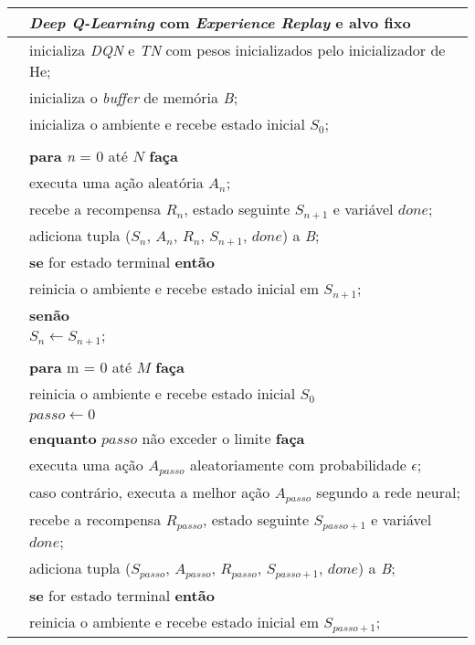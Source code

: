 \begin{tabular}{l l}

\hline
 & \textit{Deep Q-Learning} com \textit{Experience Replay} e alvo fixo\\
\hline

 & inicializa \textit{DQN} e \textit{TN} com pesos inicializados pelo inicializador de He;\\
 & inicializa o \textit{buffer} de memória \textit{B};\\
 & inicializa o ambiente e recebe estado inicial $S_{0}$;\\
\\
 & \textbf{para} \textit{n} = 0 até $N$ \textbf{faça}\\
 & \qquad executa uma ação aleatória $A_{n}$;\\
 & \qquad recebe a recompensa $R_{n}$, estado seguinte $S_{n+1}$ e variável $done$;\\
 & \qquad adiciona tupla ($S_{n}$, $A_{n}$, $R_{n}$, $S_{n+1}$, $done$) a \textit{B};\\
 & \qquad \textbf{se} for estado terminal \textbf{então}\\
 & \qquad \qquad reinicia o ambiente e recebe estado inicial em $S_{n+1}$;\\
 & \qquad \textbf{senão}\\
 & \qquad \qquad $S_{n} \leftarrow S_{n+1};$ \\
\\
 & \textbf{para} m = 0 até $M$ \textbf{faça}\\
 & \qquad reinicia o ambiente e recebe estado inicial $S_{0}$\\
 & \qquad $passo \leftarrow 0$\\
 & \qquad \textbf{enquanto} $passo$ não exceder o limite \textbf{faça}\\
 & \qquad \qquad executa uma ação $A_{passo}$ aleatoriamente com probabilidade $\epsilon$;\\
 & \qquad \qquad caso contrário, executa a melhor ação $A_{passo}$ segundo a rede neural;\\
 & \qquad \qquad recebe a recompensa $R_{passo}$, estado seguinte $S_{passo+1}$ e variável $done$;\\
 & \qquad \qquad adiciona tupla ($S_{passo}$, $A_{passo}$, $R_{passo}$, $S_{passo+1}$, $done$) a \textit{B};\\
 & \qquad \qquad \textbf{se} for estado terminal \textbf{então}\\
 & \qquad \qquad \qquad reinicia o ambiente e recebe estado inicial em $S_{passo+1}$;\\

\end{tabular}
